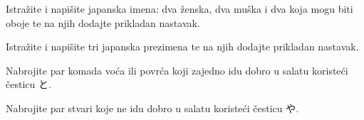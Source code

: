 
\author{Tomislav Mamić, Željka Ludošan}

	
	\begin{mondai}{}
		\item Istražite i napišite japanska imena: dva ženska, dva muška i dva koja mogu biti oboje te na njih dodajte prikladan nastavak.
		\item Istražite i napišite tri japanska prezimena te na njih dodajte prikladan nastavak.
		\item Nabrojite par komada voća ili povrća koji zajedno idu dobro u salatu koristeći česticu と.
		\item Nabrojite par stvari koje ne idu dobro u salatu koristeći česticu や.
	\end{mondai}

	
